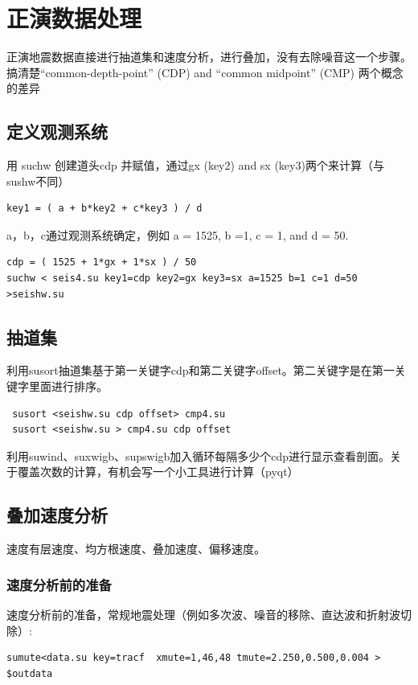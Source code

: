\chapter{正演数据处理}
 正演地震数据直接进行抽道集和速度分析，进行叠加，没有去除噪音这一个步骤。搞清楚“common-depth-point” (CDP)  and  “common midpoint” (CMP) 两个概念的差异
 \section{定义观测系统}
用 suchw 创建道头cdp 并赋值，通过gx (key2) and sx (key3)两个来计算（与sushw不同）
\begin{lstlisting}
key1 = ( a + b*key2 + c*key3 ) / d
\end{lstlisting}
a，b，c通过观测系统确定，例如 a = 1525, b =1, c = 1, and d = 50.
\begin{lstlisting}
cdp = ( 1525 + 1*gx + 1*sx ) / 50
suchw < seis4.su key1=cdp key2=gx key3=sx a=1525 b=1 c=1 d=50 >seishw.su
\end{lstlisting}

\section{抽道集}
利用susort抽道集基于第一关键字cdp和第二关键字offset。第二关键字是在第一关键字里面进行排序。
\begin{lstlisting}
 susort <seishw.su cdp offset> cmp4.su 
 susort <seishw.su > cmp4.su cdp offset
\end{lstlisting}
利用suwind、suxwigb、supswigb加入循环每隔多少个cdp进行显示查看剖面。关于覆盖次数的计算，有机会写一个小工具进行计算（pyqt）

\section{叠加速度分析}
速度有层速度、均方根速度、叠加速度、偏移速度。\par
\subsection{速度分析前的准备}
速度分析前的准备，常规地震处理（例如多次波、噪音的移除、直达波和折射波切除）:
\begin{lstlisting}
sumute<data.su key=tracf  xmute=1,46,48 tmute=2.250,0.500,0.004 > $outdata
\end{lstlisting}
